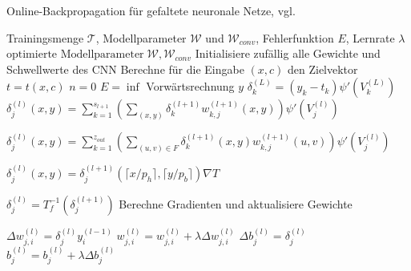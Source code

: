\begin{algorithm}[H]
    \scriptsize
    \caption{Online-Backpropagation für gefaltete neuronale Netze, vgl. \cite{du_diss}}
    \label{alg:cnn_online}
    \begin{algorithmic}
    \Require  Trainingsmenge $\mathcal{T}$, Modellparameter $\mathcal{W}$ und $\mathcal{W}_{conv}$, Fehlerfunktion $E$, Lernrate $\lambda$ 
    \Ensure $\text{optimierte Modellparameter} \; \mathcal{W}, \mathcal{W}_{conv}$
    \State Initialisiere zufällig alle Gewichte und Schwellwerte des CNN 
    \State Berechne für die Eingabe $(x,c)$ den Zielvektor $t=t(x,c)$
    \State $n=0$  
    \State $E=\inf$
     
        \State Vorwärtsrechnung $y$
            \State $\delta_k^{(L)}=(y_k-t_k) \psi'(V^{(L)}_k)$
        \EndFor
                    \State $\delta_j^{(l)}(x,y)=\sum_{k=1}^{s_{l+1}} \left(\sum_{(x,y)} \delta_k^{(l+1)} w_{k,j}^{(l+1)}(x,y)\right) \psi'(V_j^{(l)})$
                    \EndIf

                    \State $\delta_j^{(l)}(x,y)=\sum_{k=1}^{z_{out}} \left(\sum_{(u,v) \in F} \delta_k^{(l+1)}(x,y) w_{k,j}^{(l+1)}(u,v)\right) \psi'(V_j^{(l)})$
                    \EndIf

                    \State $\delta_j^{(l)}(x,y)=\delta_j^{(l+1)}(\lceil x/p_h \rceil ,\lceil y/p_b \rceil) \nabla T$
                    \EndIf

                    \State $ \delta_j^{(l)}=T^{-1}_f(\delta_j^{(l+1)})$
                    \EndIf
                \EndFor
             \EndFor
        \EndFor 
        \State Berechne Gradienten und aktualisiere Gewichte

                        \State $\Delta w_{j,i}^{(l)}= \delta_j^{(l)} y^{(l-1)}_i$
                        \State $w^{(l)}_{j,i}= w^{(l)}_{j,i} + \lambda \Delta w_{j,i}^{(l)}$
                    \EndFor
                    \State $\Delta b^{(l)}_j=\delta^{(l)}_j$
                    \State $b^{(l)}_j=b^{(l)}_j + \lambda \Delta b^{(l)}_j$
                \EndFor
            \EndIf


\end{algorithmic}
\end{algorithm}
